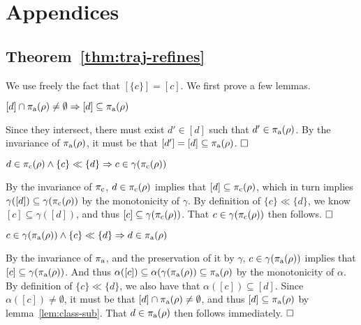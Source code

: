 \section{Appendices}

\subsection{Theorem~\ref{thm:traj-refines}}

We use freely the fact that $[\{ c \}] = [c]$. We first prove a few lemmas.

\begin{lemma} \label{lem:class-sub}
$[d] \cap \operatorname{\pi_{\textrm{a}}}(\rho) \neq \emptyset \Rightarrow [d] \subseteq \operatorname{\pi_{\textrm{a}}}(\rho)$
\end{lemma}

Since they intersect, there must exist $d' \in [d]$ such that $d' \in \operatorname{\pi_{\textrm{a}}}(\rho)$. By the invariance of $\operatorname{\pi_{\textrm{a}}}(\rho)$, it must be that $[d'] = [d] \subseteq \operatorname{\pi_{\textrm{a}}}(\rho)$. $\qedbox$

\begin{lemma} \label{lem:traj-con}
$d \in \operatorname{\pi_{\textrm{c}}}(\rho) \wedge \{ c \} \ll \{ d \} \Rightarrow c \in \gamma(\operatorname{\pi_{\textrm{c}}}(\rho))$
\end{lemma}

By the invariance of $\operatorname{\pi_{\textrm{c}}}$, $d \in \operatorname{\pi_{\textrm{c}}}(\rho)$ implies that $[d] \subseteq \operatorname{\pi_{\textrm{c}}}(\rho)$, which in turn implies $\gamma([d]) \subseteq \gamma(\operatorname{\pi_{\textrm{c}}}(\rho))$ by the monotonicity of $\gamma$. By definition of $\{ c \} \ll \{ d \}$, we know $[c] \subseteq \gamma([d])$, and thus $[c] \subseteq \gamma(\operatorname{\pi_{\textrm{c}}}(\rho))$. That $c \in \gamma(\operatorname{\pi_{\textrm{c}}}(\rho))$ then follows. $\qedbox$

\begin{lemma} \label{lem:traj-ant}
$c \in \gamma(\operatorname{\pi_{\textrm{a}}}(\rho)) \wedge \{ c \} \ll \{ d \} \Rightarrow d \in \operatorname{\pi_{\textrm{a}}}(\rho)$
\end{lemma}

By the invariance of $\operatorname{\pi_{\textrm{a}}}$, and the preservation of it by $\gamma$, $c \in \gamma(\operatorname{\pi_{\textrm{a}}}(\rho))$ implies that $[c] \subseteq \gamma(\operatorname{\pi_{\textrm{a}}}(\rho))$. And thus $\alpha([c]) \subseteq \alpha(\gamma(\operatorname{\pi_{\textrm{a}}}(\rho)) \subseteq \operatorname{\pi_{\textrm{a}}}(\rho)$ by the monotonicity of $\alpha$. By definition of $\{ c \} \ll \{ d \}$, we also have that $\alpha([c]) \subseteq [d]$. Since $\alpha([c]) \neq \emptyset$, it must be that $[d] \cap \operatorname{\pi_{\textrm{a}}}(\rho) \neq \emptyset$, and thus $[d] \subseteq \operatorname{\pi_{\textrm{a}}}(\rho)$ by lemma~\ref{lem:class-sub}. That $d \in \operatorname{\pi_{\textrm{a}}}(\rho)$ then follows immediately. $\qedbox$
\\

